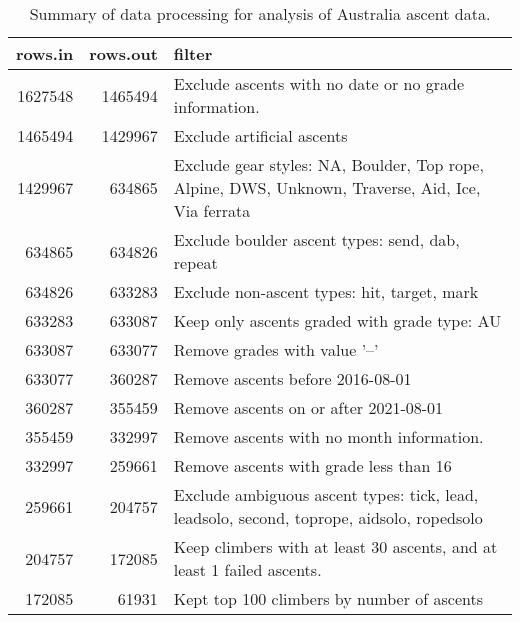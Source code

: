 \begin{table}[ht]
\centering
\begingroup\fontsize{9pt}{10pt}\selectfont
\begin{tabular}{rrl}
  \hline
{\bf rows.in} & {\bf rows.out} & {\bf filter} \\ 
  \hline
1627548 & 1465494 & Exclude ascents with no date or no grade information. \\ 
  1465494 & 1429967 & Exclude artificial ascents \\ 
  1429967 & 634865 & Exclude gear styles: NA, Boulder, Top rope, Alpine, DWS, Unknown, Traverse, Aid, Ice, Via ferrata \\ 
  634865 & 634826 & Exclude boulder ascent types: send, dab, repeat \\ 
  634826 & 633283 & Exclude non-ascent types: hit, target, mark \\ 
  633283 & 633087 & Keep only ascents graded with grade type: AU \\ 
  633087 & 633077 & Remove grades with value '--' \\ 
  633077 & 360287 & Remove ascents before 2016-08-01 \\ 
  360287 & 355459 & Remove ascents on or after 2021-08-01 \\ 
  355459 & 332997 & Remove ascents with no month information. \\ 
  332997 & 259661 & Remove ascents with grade less than 16 \\ 
  259661 & 204757 & Exclude ambiguous ascent types: tick, lead, leadsolo, second, toprope, aidsolo, ropedsolo \\ 
  204757 & 172085 & Keep climbers with at least 30 ascents, and at least 1 failed ascents. \\ 
  172085 & 61931 & Kept top 100 climbers by number of ascents \\ 
   \hline
\end{tabular}
\endgroup
\caption{Summary of data processing for analysis of Australia ascent data.} 
\label{table-data-processing-aus}
\end{table}

